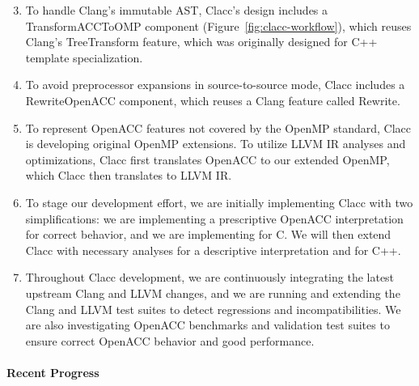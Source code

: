 \begin{enumerate}

\setcounter{enumi}{2}

\item To handle Clang's immutable AST, Clacc's design includes a
TransformACCToOMP component (Figure~\ref{fig:clacc-workflow}), which reuses Clang's TreeTransform
feature, which was originally designed for C++ template
specialization.

\item To avoid preprocessor expansions in source-to-source mode, Clacc
includes a RewriteOpenACC component, which reuses a Clang feature
called Rewrite.

\item To represent OpenACC features not covered by the OpenMP
standard, Clacc is developing original OpenMP extensions.  To utilize
LLVM IR analyses and optimizations, Clacc first translates OpenACC to
our extended OpenMP, which Clacc then translates to LLVM IR.

\item To stage our development effort, we are initially implementing
Clacc with two simplifications: we are implementing a prescriptive
OpenACC interpretation for correct behavior, and we are implementing
for C.  We will then extend Clacc with necessary analyses for a
descriptive interpretation and for C++.

\item Throughout Clacc development, we are continuously integrating the
latest upstream Clang and LLVM changes, and we are running and
extending the Clang and LLVM test suites to detect regressions and
incompatibilities.  We are also investigating OpenACC
benchmarks \cite{specAccel} and validation test
suites \cite{openACCValidationSuite} to ensure correct OpenACC
behavior and good performance.

\end{enumerate}


\paragraph{Recent Progress}

